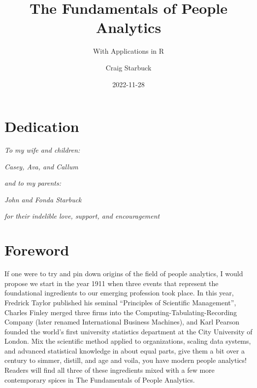 \documentclass[
]{book}
\title{The Fundamentals of People Analytics}
\subtitle{With Applications in R}
\author{Craig Starbuck}
\date{2022-11-28}
\begin{document}
\maketitle

{
\setcounter{tocdepth}{1}
\tableofcontents
}
\hypertarget{dedication}{%
\chapter*{Dedication}\label{dedication}}

\emph{To my wife and children:}

\emph{Casey, Ava, and Callum}

\emph{and to my parents:}

\emph{John and Fonda Starbuck}

\emph{for their indelible love, support, and encouragement}

\hypertarget{foreword}{%
\chapter*{Foreword}\label{foreword}}

If one were to try and pin down origins of the field of people analytics, I would propose we start in the year 1911 when three events that represent the foundational ingredients to our emerging profession took place. In this year, Fredrick Taylor published his seminal ``Principles of Scientific Management'', Charles Finley merged three firms into the Computing-Tabulating-Recording Company (later renamed International Business Machines), and Karl Pearson founded the world's first university statistics department at the City University of London. Mix the scientific method applied to organizations, scaling data systems, and advanced statistical knowledge in about equal parts, give them a bit over a century to simmer, distill, and age and voila, you have modern people analytics! Readers will find all three of these ingredients mixed with a few more contemporary spices in The Fundamentals of People Analytics.
\end{document}
